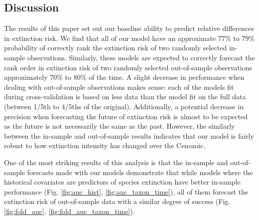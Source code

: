 \documentclass[12pt,letterpaper]{article}
\begin{document}
\begin{refsection}
%
%
%



\section{Discussion}

The results of this paper set out our baseline ability to predict relative differences in extinction risk. We find that all of our model have an approximate 77\% to 79\% probability of correctly rank the extinction risk of two randomly selected in-sample observations. Similarly, these models are expected to correctly forecast the rank order in extinction risk of two randomly selected out-of-sample observations approximately 70\% to 80\% of the time. A slight decrease in performance when dealing with out-of-sample observations makes sense: each of the models fit during cross-validation is based on less data than the model fit on the full data (between 1/5th to 4/5ths of the original). Additionally, a potential decrease in precision when forecasting the future of extinction risk is almost to be expected as the future is not necessarily the same as the past. However, the similarly between the in-sample and out-of-sample results indicates that our model is fairly robust to how extinction intensity has changed over the Cenozoic. 

One of the most striking results of this analysis is that the in-sample and out-of-sample forecasts made with our models demonstrate that while models where the historical covariates are predictors of species extinction have better in-sample performance (Fig. \ref{fig:auc_hist}, \ref{fig:auc_taxon_time}), all of them forecast the extinction risk of out-of-sample data with a similar degree of success (Fig. \ref{fig:fold_auc}, \ref{fig:fold_auc_taxon_time}).


\end{refsection}
\end{document}

